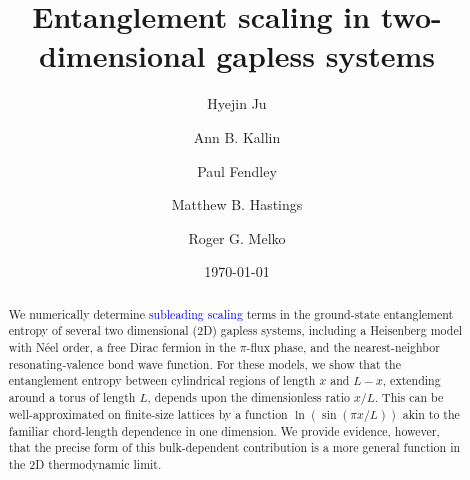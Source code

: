 \documentclass[prb,aps,twocolumn,floatfix,amsmath,amssymb,superscriptaddress,tightenlines]{revtex4}
\begin{document}
\newcommand{\be}{\begin{equation}}
\newcommand{\ee}{\end{equation}}

\date{\today}
\title{Entanglement scaling in two-dimensional gapless systems}

\author{Hyejin Ju}

\author{Ann B. Kallin}

\author{Paul Fendley}

\author{Matthew B. Hastings}

\author{Roger G. Melko}

\begin{abstract} 
We numerically determine \textcolor{blue}{subleading scaling} terms in the ground-state entanglement entropy of several two dimensional (2D) gapless systems, including a Heisenberg model with N\'eel order, a free Dirac fermion in the $\pi$-flux phase, and the nearest-neighbor resonating-valence bond wave function.
For these models, we show that the entanglement entropy between cylindrical
regions of length $x$ and $L-x$, extending around a torus of
length $L$, depends upon the dimensionless ratio $x/L$.  This can be well-approximated on finite-size lattices by a function
$\ln(\sin(\pi x/L))$ akin to the familiar chord-length dependence in one dimension. 
We provide evidence, however, that the precise form of this bulk-dependent contribution
is a more general function in the 2D thermodynamic limit.

\end{abstract}
\maketitle
\end{document}

